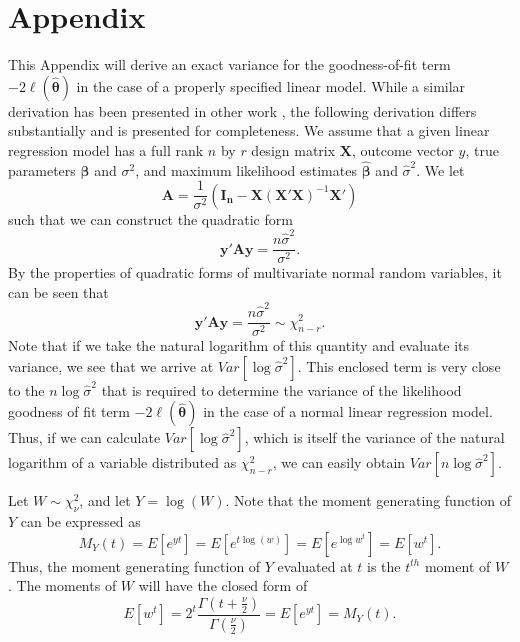 \documentclass[sn-mathphys-ay]{sn-jnl}
\begin{document}
\section{Appendix}
This Appendix will derive an exact variance for the goodness-of-fit term $-2 \ell (\hat{\bm{\theta}} )$ in the case of a properly specified
linear model. While a similar derivation has been presented in other work \citep{McQuarrie}, the following derivation differs substantially and is presented for completeness.
We assume that a given linear regression model has a full rank $n$ by $r$ design matrix $\bm{X}$, outcome vector $y$, true parameters $\bm{\beta}$ and $\sigma^2$,
and maximum likelihood estimates $\hat{\bm{\beta}}$ and $\hat{\sigma}^2$. We let
\begin{equation*}
	\bm{A} = \frac{1}{\sigma^2} (\bm{I_n} - \bm{X}(\bm{X}'\bm{X})^{-1}\bm{X}') 
\end{equation*}
such that we can construct the quadratic form
\begin{equation*}
	\bm{y'Ay} = \frac{n \hat{\sigma}^2}{\sigma^2} .
\end{equation*}
By the properties of quadratic forms of multivariate normal random variables, it can be seen that
\begin{equation}
	\bm{y'Ay} = \frac{n \hat{\sigma}^2}{\sigma^2} \sim \chi^2_{n-r} .
\end{equation}
Note that if we take the natural logarithm of this quantity and evaluate its variance, we see that we arrive at $Var \left[ \log \hat{\sigma}^2 \right]$. This enclosed term is very close to the $n \log \hat{\sigma}^2$ that is required
to determine the variance of the likelihood goodness of fit term $-2 \ell (\hat{\bm{\theta}} )$ in the case of a normal linear regression model.
Thus, if we can calculate $Var \left[ \log \hat{\sigma}^2 \right]$, which is itself the variance
of the natural logarithm of a variable distributed as $\chi^2_{n-r}$, we can easily obtain $Var \left[ n \log \hat{\sigma}^2 \right]$.

Let $W \sim \chi^2_{\nu}$, and let $Y = \log(W)$. Note that the moment generating function of $Y$ can be expressed as
\begin{equation*}
	M_Y (t) = E \left[ e^{yt} \right] = E \left[ e^{t\log(w)} \right] = E \left[ e^{\log w^t} \right] = E \left[ w^t \right] .
\end{equation*}
Thus, the moment generating function of $Y$ evaluated at $t$ is the $t^{th}$ moment of $W$. The moments of $W$ will have the
closed form of
\begin{equation*}
	E \left[ w^t \right] = 2^t \frac{\Gamma (t + \frac{\nu}{2})}{\Gamma (\frac{\nu}{2})} = E \left[ e^{yt} \right] = M_Y (t) .
\end{equation*}
\end{document}
